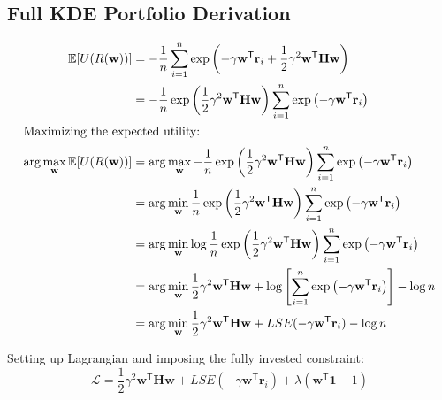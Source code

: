 \chapter[Appendix]{}

\section{Full KDE Portfolio Derivation}
\label{app:kde}
\begin{align*}
  \mathbb{E}[U(R(\mathbf{w}))] &= -\frac{1}{n}\sum_{i=1}^{n}\exp\left(-\gamma\mathbf{w}^{\mathsf{T}}\mathbf{r}_i+\frac{1}{2}\gamma^2\mathbf{w}^{\mathsf{T}}\mathbf{H}\mathbf{w}\right) \\
  &= -\frac{1}{n}\exp\left(\frac{1}{2}\gamma^2\mathbf{w}^{\mathsf{T}}\mathbf{H}\mathbf{w}\right)\sum_{i=1}^{n}\exp\left(-\gamma\mathbf{w}^{\mathsf{T}}\mathbf{r}_i\right) \\
  \intertext{Maximizing the expected utility:}
  \arg\max_\mathbf{w}{\mathbb{E}[U(R(\mathbf{w}))]} &= \arg\max_\mathbf{w}{-\frac{1}{n}\exp\left(\frac{1}{2}\gamma^2\mathbf{w}^{\mathsf{T}}\mathbf{H}\mathbf{w}\right)\sum_{i=1}^{n}\exp\left(-\gamma\mathbf{w}^{\mathsf{T}}\mathbf{r}_i\right)} \\
  &= \arg\min_\mathbf{w}{{\frac{1}{n}\exp\left(\frac{1}{2}\gamma^2\mathbf{w}^{\mathsf{T}}\mathbf{H}\mathbf{w}\right)\sum_{i=1}^{n}\exp\left(-\gamma\mathbf{w}^{\mathsf{T}}\mathbf{r}_i\right)}} \\
  &= \arg\min_\mathbf{w}\log{{{\frac{1}{n}\exp\left(\frac{1}{2}\gamma^2\mathbf{w}^{\mathsf{T}}\mathbf{H}\mathbf{w}\right)\sum_{i=1}^{n}\exp\left(-\gamma\mathbf{w}^{\mathsf{T}}\mathbf{r}_i\right)}}} \\
  &= \arg\min_\mathbf{w}{\frac{1}{2}\gamma^2\mathbf{w}^{\mathsf{T}}\mathbf{H}\mathbf{w}+\log{\left[\sum_{i=1}^{n}\exp\left(-\gamma\mathbf{w}^{\mathsf{T}}\mathbf{r}_i\right)\right]}}-\log n \\
  &= \arg\min_\mathbf{w}\frac{1}{2}\gamma^2\mathbf{w}^{\mathsf{T}}\mathbf{H}\mathbf{w}+LSE(-\gamma\mathbf{w}^{\mathsf{T}}\mathbf{r}_i)-\log n
  \end{align*}

Setting up Lagrangian and imposing the fully invested constraint:
$$\mathcal{L}=\frac{1}{2}\gamma^2\mathbf{w}^{\mathsf{T}}\mathbf{H}\mathbf{w}+LSE(-\gamma\mathbf{w}^{\mathsf{T}}\mathbf{r}_i)+\lambda(\mathbf{w^{\mathsf{T}}1}-1)$$


